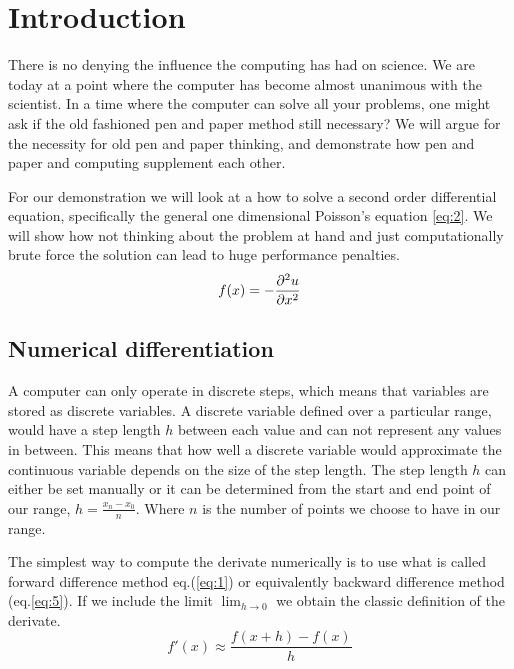 \section*{Introduction}
There is no denying the influence the computing has had on science. We
are today at a point where the computer has become almost unanimous with the
scientist. In a time where the computer can solve all your problems, one might
ask if the old fashioned pen and paper method still necessary? We will argue for
the necessity for old pen and paper thinking, and demonstrate how pen and paper and
computing supplement each other. 

For our demonstration we will look at a how to solve a second order
differential equation, specifically the general one dimensional Poisson's
equation \cref{eq:2}. We will show how not thinking about the problem at hand
and just computationally brute force  the solution can lead to huge performance
penalties.   
\begin{equation}\label{eq:2}
  f(x)= - \pd[^2u]{x^2}
\end{equation}

\subsection*{Numerical differentiation}
\par A computer can only operate in discrete steps, which means that variables
are stored as discrete variables. A discrete variable  defined over a particular
range, would 
have a step length $h$ between each value and can not represent any values in
between. This means that how well a discrete variable would approximate the
continuous variable depends on the size of the step length. The step length $h$
can either be set manually or it can be determined from the start and end
point of our range, $h = \frac{x_n -x_0}{n}$. Where $n$ is the number
of points we choose to have in our range. 
\par
The simplest way to compute the derivate numerically is to use what is called
forward difference method eq.(\ref{eq:1}) or equivalently backward difference
method (eq.\ref{eq:5}). If we include the limit $\lim_{h\to 0}$ we obtain the
classic definition of the derivate. 
\begin{equation}\label{eq:1}
    f'(x) \approx \frac{f(x+h)-f(x)}{h}
\end{equation}

